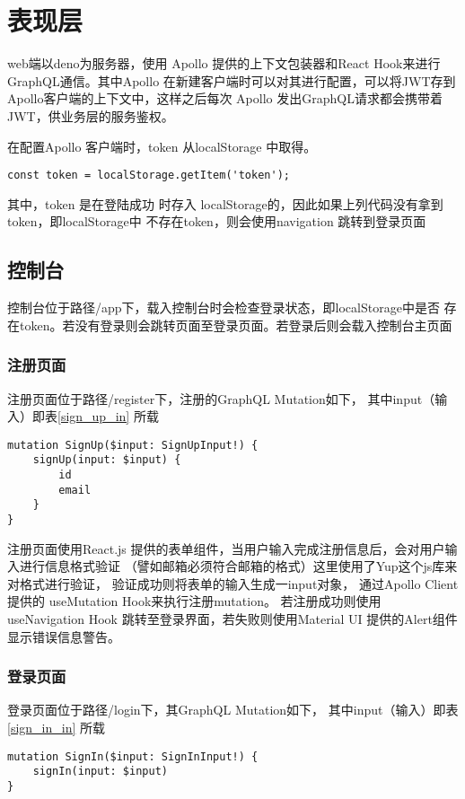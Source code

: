 \section{表现层}
web端以deno为服务器，使用 Apollo 提供的上下文包装器和React Hook来进行
GraphQL通信。其中Apollo 在新建客户端时可以对其进行配置，可以将JWT存到
Apollo客户端的上下文中，这样之后每次 Apollo 发出GraphQL请求都会携带着
JWT，供业务层的服务鉴权。

在配置Apollo 客户端时，token 从localStorage 中取得。
\begin{lstlisting}
const token = localStorage.getItem('token');
\end{lstlisting}

其中，token 是在登陆成功
时存入 localStorage的，因此如果上列代码没有拿到token，即localStorage中
不存在token，则会使用navigation 跳转到登录页面

\subsection{控制台}
控制台位于路径/app下，载入控制台时会检查登录状态，即localStorage中是否
存在token。若没有登录则会跳转页面至登录页面。若登录后则会载入控制台主页面

\subsubsection{注册页面}
注册页面位于路径/register下，注册的GraphQL Mutation如下，
其中input（输入）即表\ref{sign_up_in} 所载
\begin{lstlisting}
mutation SignUp($input: SignUpInput!) {
    signUp(input: $input) {
        id
        email
    }
}
\end{lstlisting}

注册页面使用React.js 提供的表单组件，当用户输入完成注册信息后，会对用户输入进行信息格式验证
（譬如邮箱必须符合邮箱的格式）这里使用了Yup这个js库来对格式进行验证，
验证成功则将表单的输入生成一input对象，
通过Apollo Client 提供的 useMutation Hook来执行注册mutation。
若注册成功则使用 useNavigation Hook 跳转至登录界面，若失败则使用Material UI 提供的Alert组件
显示错误信息警告。

\subsubsection{登录页面}
登录页面位于路径/login下，其GraphQL Mutation如下，
其中input（输入）即表\ref{sign_in_in} 所载
\begin{lstlisting}
mutation SignIn($input: SignInInput!) {
    signIn(input: $input)
}
\end{lstlisting}

